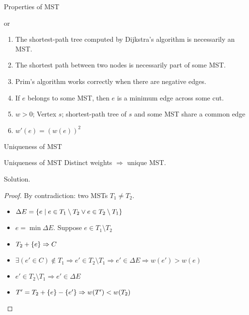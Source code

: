 \begin{frame}{Properties of MST}
  \begin{exampleblock}{\cmark or \xmark {}}
    \begin{enumerate}
      \setcounter{enumi}{\theenumTemp}
      \item \xmark The shortest-path tree computed by Dijkstra's algorithm is
      necessarily an MST.
      \item \xmark The shortest path between two nodes is necessarily part of some
      MST.
      \item \cmark Prim's algorithm works correctly when there are negative edges.
      \item \cmark If $e$ belongs to some MST, then $e$ is a minimum edge across some
      cut.
      \item \cmark $w > 0$; Vertex $s$; shortest-path tree of $s$ and some MST share
      a common edge
      \item \cmark $w'(e) = \left(w(e)\right)^2$ 
    \end{enumerate}
  \end{exampleblock}
\end{frame}
\begin{frame}{Uniqueness of MST}
  \begin{exampleblock}{Uniqueness of MST }
    Distinct weights $\Rightarrow$ unique MST.
  \end{exampleblock}

  \begin{block}{Solution.}
    \begin{proof}
      By contradiction: two MSTs $T_1 \neq T_2$.
      \begin{itemize}
	\item $\Delta E = \{e \mid e \in T_1 \setminus T_2 \lor e \in T_2
	  \setminus T_1\}$
	\item $e = \min \Delta E$. Suppose $e \in T_1 \setminus T_2$
	\item $T_2 + \{e\} \Rightarrow C$
	\item $\exists (e' \in C) \notin T_1 \Rightarrow e' \in T_{2} \setminus T_{1} \Rightarrow e' \in \Delta E \Rightarrow w(e') > w(e)$
	\item $e' \in T_{2} \setminus T_{1} \Rightarrow e' \in \Delta E$
	\item $T' = T_{2} + \{e\} - \{e'\} \Rightarrow w(T') < w(T_{2})$
      \end{itemize}
    \end{proof}
  \end{block}
\end{frame}
